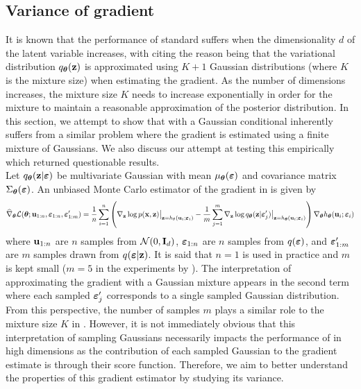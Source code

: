 \documentclass[10pt]{article}
\begin{document}
\subsection{Variance of gradient} \label{sec:variance}

It is known that the performance of standard \sivi suffers when the dimensionality $d$ of the latent variable increases, with \citet{Molchanova:2019} citing the reason being that the variational distribution $q_{\bm{\theta}}(\mathbf{z})$ is approximated using $K+1$ Gaussian distributions (where $K$ is the mixture size) when estimating the \elbo gradient. As the number of dimensions increases, the mixture size $K$ needs to increase exponentially in order for the mixture to maintain a reasonable approximation of the posterior distribution. In this section, we attempt to show that \uivi with a Gaussian conditional inherently suffers from a similar problem where the \elbo gradient is estimated using a finite mixture of Gaussians. We also discuss our attempt at testing this empirically which returned questionable results.
\\

Let $q_{\bm{\theta}}(\mathbf{z}|\bm{\varepsilon})$ be multivariate Gaussian with mean $\mu_{\bm{\theta}}(\bm{\varepsilon})$ and covariance matrix $\Sigma_{\bm{\theta}}(\bm{\varepsilon})$. An unbiased Monte Carlo estimator of the \elbo gradient in \uivi is given by
\[
\widehat{\nabla}_{\bm{\theta}}\mathcal{L}({\bm{\theta}};\mathbf{u}_{1:n},\bm{\varepsilon}_{1:n},\bm{\varepsilon}_{1:m}') = \frac{1}{n}\sum_{i=1}^n \left(\nabla_{\mathbf{z}}\log p(\mathbf{x},\mathbf{z})\big|_{\mathbf{z}=h_\theta(\mathbf{u}_i;\bm{\varepsilon}_i)} - \frac{1}{m}\sum_{j=1}^m \nabla_{\mathbf{z}}\log q_{\bm{\theta}}(\mathbf{z}|\bm{\varepsilon}_j')\big|_{\mathbf{z}=h_{\bm{\theta}}(\mathbf{u}_i;\bm{\varepsilon}_i)} \right)\nabla_{\bm{\theta}} h_{\bm{\theta}}(\mathbf{u}_i;\bm{\varepsilon}_i)
\]
where $\mathbf{u}_{1:n}$ are $n$ \iid samples from $\mathcal{N}(0,\mathbf{I}_d)$, $\bm{\varepsilon}_{1:n}$ are $n$ \iid samples from $q(\bm{\varepsilon})$, and $\bm{\varepsilon}_{1:m}'$ are $m$ \mcmc samples drawn from $q(\bm{\varepsilon}|\mathbf{z})$. It is said that $n=1$ is used in practice and $m$ is kept small ($m=5$ in the experiments by \citet{Titsias:2019}). The interpretation of approximating the \elbo gradient with a Gaussian mixture appears in the second term where each sampled $\bm{\varepsilon}_j'$ corresponds to a single sampled Gaussian distribution. From this perspective, the number of \mcmc samples $m$ plays a similar role to the mixture size $K$ in \sivi. However, it is not immediately obvious that this interpretation of sampling Gaussians necessarily impacts the performance of \uivi in high dimensions as the contribution of each sampled Gaussian to the gradient estimate is through their score function. Therefore, we aim to better understand the properties of this gradient estimator by studying its variance.
\\
\end{document}
